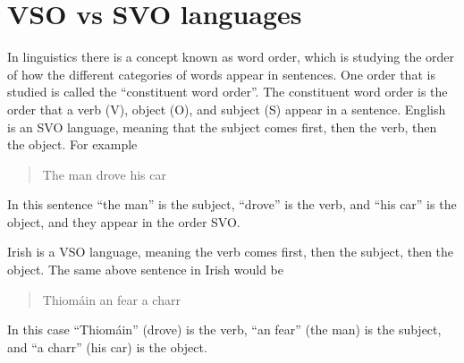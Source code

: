 \section{VSO vs SVO languages}

In linguistics there is a concept known as word order, which is studying the order of how the different categories of words appear in sentences. One order that is studied is called the ``constituent word order''. The constituent word order is the order that a verb (V), object (O), and subject (S) appear in a sentence\cite{wordorder}. English is an SVO language, meaning that the subject comes first, then the verb, then the object. For example
\begin{quote}
    The man drove his car
\end{quote}
In this sentence ``the man'' is the subject, ``drove'' is the verb, and ``his car'' is the object, and they appear in the order SVO.

Irish is a VSO language, meaning the verb comes first, then the subject, then the object. The same above sentence in Irish would be
\begin{quote}
    Thiomáin an fear a charr
\end{quote}
In this case ``Thiomáin'' (drove) is the verb, ``an fear'' (the man) is the subject, and ``a charr'' (his car) is the object.

